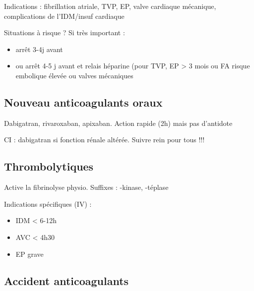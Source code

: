 Indications : fibrillation atriale, TVP, EP, valve cardiaque mécanique,
complications de l'IDM/insuf cardiaque

Situations à risque ? Si très important :
\begin{itemize}
  \item arrêt 3-4j avant
  \item ou arrêt 4-5 j avant et relais héparine (pour TVP, EP > 3 mois ou FA
    risque embolique élevée ou valves mécaniques
\end{itemize}

\subsection{Nouveau anticoagulants oraux}
Dabigatran, rivaroxaban, apixaban. Action rapide (2h) mais pas d'antidote

CI : dabigatran si fonction rénale altérée. Suivre rein pour tous !!!

\subsection{Thrombolytiques}
Active la fibrinolyse physio. Suffixes : -kinase, -téplase

Indications spécifiques (IV) : 
\begin{itemize}
  \item IDM < 6-12h
  \item AVC < 4h30
  \item EP grave
\end{itemize}

\subsection{Accident anticoagulants}
